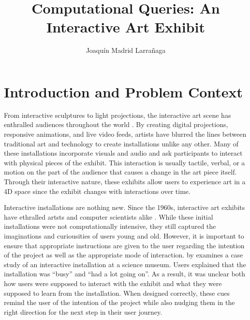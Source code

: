 \documentclass[10pt,twocolumn]{article}
\title{Computational Queries: An Interactive Art Exhibit}
\author{Joaquín Madrid Larrañaga}
\affiliation{Occidental College}
\begin{document}
\maketitle

\section{Introduction and Problem Context}
From interactive sculptures to light projections, the interactive art scene has enthralled audiences throughout the world \cite{sarto_disneys_2021, noauthor_teamlab_2020}.  By creating digital projections, responsive animations, and live video feeds, artists have blurred the lines between traditional art and technology to create installations unlike any other.  Many of these installations incorporate visuals and audio and ask participants to interact with physical pieces of the exhibit. This interaction is usually tactile, verbal, or a motion on the part of the audience that causes a change in the art piece itself.  Through their interactive nature, these exhibits allow users to experience art in a 4D space since the exhibit changes with interactions over time. 

Interactive installations are nothing new. Since the 1960s, interactive art exhibits have ethralled artsts and computer scientists alike \cite{trifonova_software_2008}.  While these initial installations were not computationally intensive, they still captured the imaginations and curiousities of users young and old.  However, it is important to ensure that appropriate instructions are given to the user regarding the intention of the project as well as the appropriate mode of interaction.  by \citeauthor{hornecker_x201ci_2008} examines a case study of an interactive installation at a science museum.  Users explained that the installation was ``busy'' and ``had a lot going on''.  As a result, it was unclear both how users were supposed to interact with the exhibit and what they were supposed to learn from the installation. When designed correctly, these cues remind the user of the intention of the project while also nudging them in the right direction for the next step in their user journey.  
\end{document}
